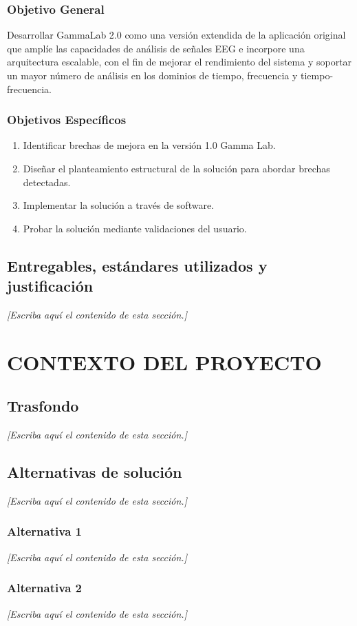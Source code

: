\documentclass[12pt,letterpaper,oneside]{article}
\newcommand{\pendiente}[1][Escriba aquí el contenido de esta sección.]{%
  {\color{gray!75}\itshape [#1]}\par}
\newcommand{\capitulo}[1]{\clearpage\section{#1}}
\begin{document}
\subsubsection{Objetivo General}
Desarrollar GammaLab 2.0 como una versión extendida de la aplicación original que amplíe
las capacidades de análisis de señales EEG e incorpore una arquitectura escalable, con el
fin de mejorar el rendimiento del sistema y soportar un mayor número de análisis en los
dominios de tiempo, frecuencia y tiempo-frecuencia.

\subsubsection{Objetivos Específicos}
\begin{enumerate}
  \item Identificar brechas de mejora en la versión 1.0 Gamma Lab.
  \item Diseñar el planteamiento estructural de la solución para abordar brechas detectadas.
  \item Implementar la solución a través de software.
  \item Probar la solución mediante validaciones del usuario.
\end{enumerate}

\subsection{Entregables, estándares utilizados y justificación}
\pendiente

\capitulo{CONTEXTO DEL PROYECTO}

\subsection{Trasfondo}
\pendiente

\subsection{Alternativas de solución}
\pendiente

\subsubsection{Alternativa 1}
\pendiente

\subsubsection{Alternativa 2}
\pendiente
\end{document}
